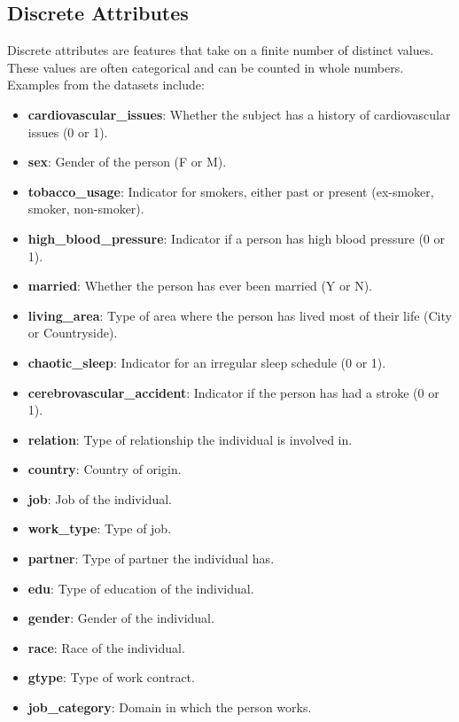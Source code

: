 \documentclass[a4paper,12pt]{article}
\begin{document}
\subsection{Discrete Attributes}

Discrete attributes are features that take on a finite number of distinct values. These values are often categorical and can be counted in whole numbers. Examples from the datasets include:

\begin{itemize}
    \item \textbf{cardiovascular\_issues}: Whether the subject has a history of cardiovascular issues (0 or 1).
    \item \textbf{sex}: Gender of the person (F or M).
    \item \textbf{tobacco\_usage}: Indicator for smokers, either past or present (ex-smoker, smoker, non-smoker).
    \item \textbf{high\_blood\_pressure}: Indicator if a person has high blood pressure (0 or 1).
    \item \textbf{married}: Whether the person has ever been married (Y or N).
    \item \textbf{living\_area}: Type of area where the person has lived most of their life (City or Countryside).
    \item \textbf{chaotic\_sleep}: Indicator for an irregular sleep schedule (0 or 1).
    \item \textbf{cerebrovascular\_accident}: Indicator if the person has had a stroke (0 or 1).
    \item \textbf{relation}: Type of relationship the individual is involved in.
    \item \textbf{country}: Country of origin.
    \item \textbf{job}: Job of the individual.
    \item \textbf{work\_type}: Type of job.
    \item \textbf{partner}: Type of partner the individual has.
    \item \textbf{edu}: Type of education of the individual.
    \item \textbf{gender}: Gender of the individual.
    \item \textbf{race}: Race of the individual.
    \item \textbf{gtype}: Type of work contract.
    \item \textbf{job\_category}: Domain in which the person works.
\end{itemize}
\end{document}
